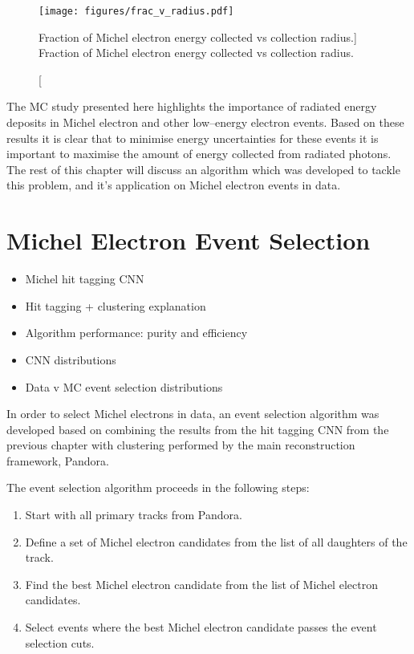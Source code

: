 \begin{figure}
	\centering
	\texttt{[image: figures/frac\_v\_radius.pdf]}
	\caption
	[Fraction of Michel electron energy collected vs collection radius.]
	{Fraction of Michel electron energy collected vs collection radius.}
	\label{fig:frac_v_radius}
\end{figure}

The MC study presented here highlights the importance of radiated energy
deposits in Michel electron and other low--energy electron events. Based on
these results it is clear that to minimise energy uncertainties for these events
it is important to maximise the amount of energy collected from radiated 
photons. The rest of this chapter will discuss an algorithm which was developed 
to tackle this problem, and it's application on Michel electron events in 
\protodune{} data.

\section{Michel Electron Event Selection} \label{ME_ES}
\begin{mccorrection}
	\begin{itemize}
	\item Michel hit tagging CNN
	\item Hit tagging + clustering explanation
	\item Algorithm performance: purity and efficiency
	\item CNN distributions
	\item Data v MC event selection distributions
	\end{itemize}
\end{mccorrection}

In order to select Michel electrons in \protodune{} data, an event selection
algorithm was developed based on combining the results from the hit tagging CNN 
from the previous chapter with clustering performed by the main \protodune{} 
reconstruction framework, Pandora. 

The event selection algorithm proceeds in the following steps:
\begin{enumerate}
	\item Start with all primary tracks from Pandora.
	\item Define a set of Michel electron candidates from the list of all
		daughters of the track.
	\item Find the best Michel electron candidate from the list of Michel electron
		candidates.
	\item Select events where the best Michel electron candidate passes the event
		selection cuts.
\end{enumerate}

